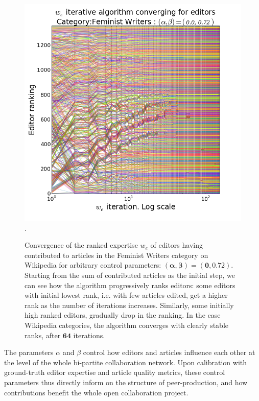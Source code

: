 \begin{figure}[!t]
\centering
\includegraphics[width=0.9\columnwidth]{../Figures/fem_editors_iter_converge.png}.
\caption{Convergence of the ranked expertise $w_e$ of editors having contributed to articles in the Feminist Writers category on Wikipedia for arbitrary control parameters: $\mathbf{(\alpha,\beta) =(0, 0.72)}$. Starting from the sum of contributed articles as the initial step, we can see how the algorithm progressively ranks editors: some editors with initial lowest rank, i.e. with few articles edited, get a higher rank as the number of iterations increases. Similarly, some initially high ranked editors, gradually drop in the ranking. In the case Wikipedia categories, the algorithm converges with clearly stable ranks, after $\mathbf{64}$ iterations.}
\label{fig:convergence}
\end{figure}


The parameters $\alpha$ and $\beta$ control how editors and articles influence each other at the level of the whole bi-partite collaboration network. Upon calibration with ground-truth editor expertise and article quality metrics, these control parameters thus directly inform on the structure of peer-production, and how contributions benefit the whole open collaboration project. 


